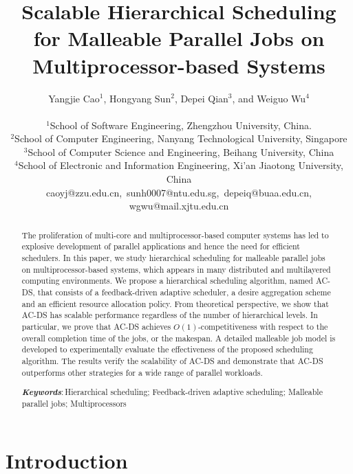 \documentclass[10pt, a4paper]{article}
\def\keywords{\vspace{.5em}
{\textit{\bf Keywords}:\,\relax }}
\def\endkeywords{\par}
\begin{document}
\title{Scalable Hierarchical Scheduling for Malleable Parallel Jobs on Multiprocessor-based Systems}\author{Yangjie Cao$^1$, Hongyang Sun$^2$, Depei Qian$^3$, and Weiguo Wu$^4$ \\
 \\
$^1$School of Software Engineering, Zhengzhou University, China. \\
$^2$School of Computer Engineering, Nanyang Technological University, Singapore\\
$^3$School of Computer Science and Engineering, Beihang University, China\\
$^4$School of Electronic and Information Engineering, Xi'an Jiaotong University, China\\
caoyj@zzu.edu.cn,~sunh0007@ntu.edu.sg,~depeiq@buaa.edu.cn, wgwu@mail.xjtu.edu.cn
}\date{}
\maketitle

\begin{abstract}
The proliferation of multi-core and multiprocessor-based computer systems has led to explosive
development of parallel applications and hence the need for efficient schedulers. In this paper, we
study hierarchical scheduling for malleable parallel jobs on multiprocessor-based systems, which
appears in many distributed and multilayered computing environments. We propose a hierarchical
scheduling algorithm, named AC-DS, that consists of a feedback-driven adaptive scheduler, a desire
aggregation scheme and an efficient resource allocation policy. From theoretical perspective, we
show that AC-DS has scalable performance regardless of the number of hierarchical levels. In
particular, we prove that AC-DS achieves $O(1)$-competitiveness with respect to the overall
completion time of the jobs, or the makespan. A detailed malleable job model is developed to
experimentally evaluate the effectiveness of the proposed scheduling algorithm. The results verify
the scalability of AC-DS and demonstrate that AC-DS outperforms other strategies for a wide range
of parallel workloads.

\keywords Hierarchical scheduling; Feedback-driven adaptive scheduling; Malleable parallel jobs;
Multiprocessors
\endkeywords

\end{abstract}

\section{Introduction}
\end{document}
